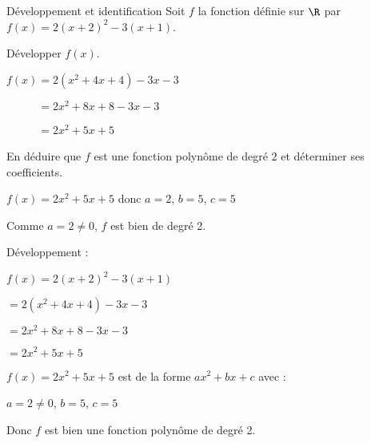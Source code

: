 \begin{EXO}{Développement et identification}{}
Soit $f$ la fonction définie sur $\R$ par $ f(x) = 2(x+2)^2 - 3(x+1)$.
\begin{tcbenumerate}[2]
\tcbitem {} Développer $f(x)$.

\begin{crep}
$f(x) = 2(x^2+4x+4) - 3x - 3 $

$\phantom{f(x)}= 2x^2+8x+8-3x-3 $

$\phantom{f(x)}= 2x^2+5x+5$
\end{crep}

\tcbitem {} En déduire que $f$ est une fonction polynôme de degré $2$ et déterminer ses coefficients.

\begin{crep}
$f(x) = 2x^2+5x+5$ donc $a=2$, $b=5$, $c=5$

Comme $a=2 \neq 0$, $f$ est bien de degré 2.
\end{crep}
\end{tcbenumerate}

\exocorrection

\begin{tcbenumerate}[2]
\tcbitem Développement :

$f(x) = 2(x+2)^2 - 3(x+1)$

$= 2(x^2+4x+4) - 3x - 3$

$= 2x^2+8x+8-3x-3$

$= 2x^2+5x+5$

\tcbitem $f(x) = 2x^2+5x+5$ est de la forme $ax^2+bx+c$ avec :

$a = 2 \neq 0$, $b = 5$, $c = 5$

Donc $f$ est bien une fonction polynôme de degré 2.
\end{tcbenumerate}
\end{EXO}
